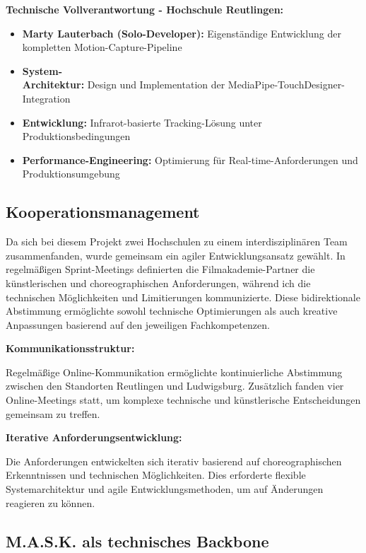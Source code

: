 \textbf{Technische Vollverantwortung - Hochschule Reutlingen:}
\begin{itemize}
    \item \textbf{Marty Lauterbach (Solo-Developer):} Eigenständige Entwicklung der kompletten Motion-Capture-Pipeline
    \item \textbf{System-\\Architektur:} Design und Implementation der MediaPipe-TouchDesigner-\\Integration
    \item \textbf{Entwicklung:} Infrarot-basierte Tracking-Lösung unter Produktionsbedingungen
    \item \textbf{Performance-Engineering:} Optimierung für Real-time-Anforderungen und Produktionsumgebung
\end{itemize}

\subsection{Kooperationsmanagement}

Da sich bei diesem Projekt zwei Hochschulen zu einem interdisziplinären Team zusammenfanden, wurde gemeinsam ein agiler Entwicklungsansatz gewählt. In regelmäßigen Sprint-Meetings definierten die Filmakademie-Partner die künstlerischen und choreographischen Anforderungen, während ich die technischen Möglichkeiten und Limitierungen kommunizierte. Diese bidirektionale Abstimmung ermöglichte sowohl technische Optimierungen als auch kreative Anpassungen basierend auf den jeweiligen Fachkompetenzen.

\textbf{Kommunikationsstruktur:}

\raggedright Regelmäßige Online-Kommunikation ermöglichte kontinuierliche Abstimmung zwischen den Standorten Reutlingen und Ludwigsburg. Zusätzlich fanden vier Online-Meetings statt, um komplexe technische und künstlerische Entscheidungen gemeinsam zu treffen.

\textbf{Iterative Anforderungsentwicklung:}

\raggedright Die Anforderungen entwickelten sich iterativ basierend auf choreographischen Erkenntnissen und technischen Möglichkeiten. Dies erforderte flexible Systemarchitektur und agile Entwicklungsmethoden, um auf Änderungen reagieren zu können.

\subsection{M.A.S.K. als technisches Backbone}

